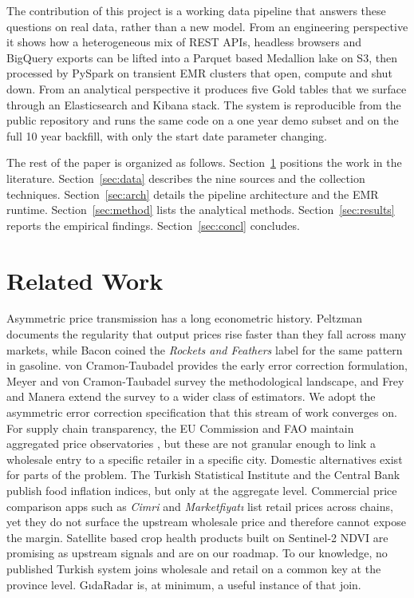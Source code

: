 \documentclass[conference]{IEEEtran}
\begin{document}
The contribution of this project is a working data pipeline that answers these questions on real data, rather than a new model. From an engineering perspective it shows how a heterogeneous mix of REST APIs, headless browsers and BigQuery exports can be lifted into a Parquet based Medallion lake on S3, then processed by PySpark on transient EMR clusters that open, compute and shut down. From an analytical perspective it produces five Gold tables that we surface through an Elasticsearch and Kibana stack. The system is reproducible from the public repository and runs the same code on a one year demo subset and on the full 10 year backfill, with only the start date parameter changing.

The rest of the paper is organized as follows. Section~\ref{sec:related} positions the work in the literature. Section~\ref{sec:data} describes the nine sources and the collection techniques. Section~\ref{sec:arch} details the pipeline architecture and the EMR runtime. Section~\ref{sec:method} lists the analytical methods. Section~\ref{sec:results} reports the empirical findings. Section~\ref{sec:concl} concludes.

\section{Related Work}
\label{sec:related}

Asymmetric price transmission has a long econometric history. Peltzman \cite{peltzman2000} documents the regularity that output prices rise faster than they fall across many markets, while Bacon \cite{bacon1991} coined the \textit{Rockets and Feathers} label for the same pattern in gasoline. von Cramon-Taubadel \cite{vct1998} provides the early error correction formulation, Meyer and von Cramon-Taubadel \cite{meyer2004} survey the methodological landscape, and Frey and Manera \cite{freymanera2007} extend the survey to a wider class of estimators. We adopt the asymmetric error correction specification that this stream of work converges on. For supply chain transparency, the EU Commission and FAO maintain aggregated price observatories \cite{faooutlook}, but these are not granular enough to link a wholesale entry to a specific retailer in a specific city. Domestic alternatives exist for parts of the problem. The Turkish Statistical Institute and the Central Bank \cite{tcmbevds} publish food inflation indices, but only at the aggregate level. Commercial price comparison apps such as \textit{Cimri} and \textit{Marketfiyatı} list retail prices across chains, yet they do not surface the upstream wholesale price and therefore cannot expose the margin. Satellite based crop health products built on Sentinel-2 NDVI \cite{sentinel2} are promising as upstream signals and are on our roadmap. To our knowledge, no published Turkish system joins wholesale and retail on a common key at the province level. GıdaRadar is, at minimum, a useful instance of that join.
\end{document}

